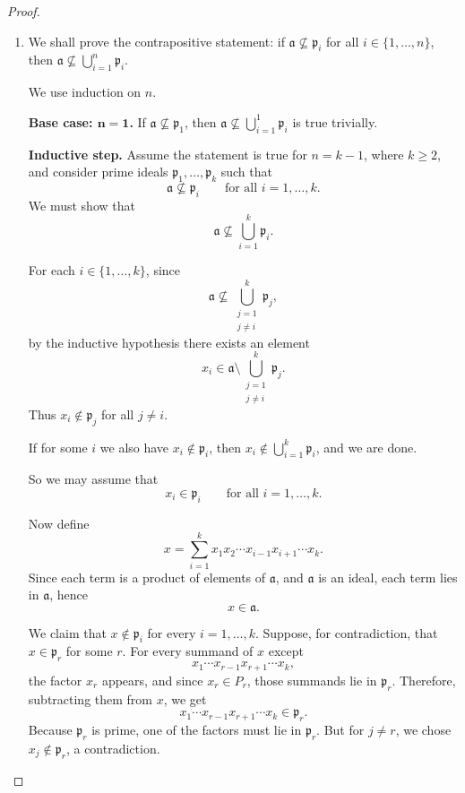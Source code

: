 \begin{proof}
    \begin{enumerate}[label=\roman*), leftmargin=*]
        \item We shall prove the contrapositive statement: if \(\mathfrak{a} \not\subseteq \mathfrak{p}_i\) for all \(i \in \{1, \ldots, n\}\), then \(\mathfrak{a} \not\subseteq \bigcup_{i=1}^n \mathfrak{p}_i\).

        We use induction on \(n\).

        \textbf{Base case: \(\mathbf{n=1}\).} If \(\mathfrak{a} \not\subseteq \mathfrak{p}_1\), then \(\mathfrak{a} \not\subseteq \bigcup_{i=1}^1 \mathfrak{p}_i\) is true trivially.

        \textbf{Inductive step.} Assume the statement is true for \(n=k-1\), where \(k\ge 2\), and consider prime ideals
\(\mathfrak{p}_1,\dots,\mathfrak{p}_k\) such that
\[
\mathfrak{a} \nsubseteq \mathfrak{p}_i \qquad \text{for all } i=1,\dots,k.
\]
We must show that
\[
\mathfrak{a} \nsubseteq \bigcup_{i=1}^k \mathfrak{p}_i.
\]

For each \(i\in\{1,\dots,k\}\), since
\[
\mathfrak{a} \nsubseteq \bigcup_{\substack{j=1\\ j\ne i}}^k \mathfrak{p}_j,
\]
by the inductive hypothesis there exists an element
\[
x_i \in \mathfrak{a} \setminus \bigcup_{\substack{j=1\\ j\ne i}}^k \mathfrak{p}_j.
\]
Thus \(x_i\notin \mathfrak{p}_j\) for all \(j\neq i\).

If for some \(i\) we also have \(x_i\notin \mathfrak{p}_i\), then \(x_i\notin \bigcup_{i=1}^k \mathfrak{p}_i\), and we are done.

So we may assume that
\[
x_i\in \mathfrak{p}_i \qquad \text{for all } i=1,\dots,k.
\]

Now define
\[
x=\sum_{i=1}^k x_1x_2\cdots x_{i-1}x_{i+1}\cdots x_k.
\]
Since each term is a product of elements of \(\mathfrak{a}\), and \(\mathfrak{a}\) is an ideal, each term lies in \(\mathfrak{a}\), hence
\[
x\in \mathfrak{a}.
\]

We claim that \(x\notin \mathfrak{p}_i\) for every \(i=1,\dots,k\). Suppose, for contradiction, that \(x\in \mathfrak{p}_r\) for some \(r\).
For every summand of \(x\) except
\[
x_1\cdots x_{r-1}x_{r+1}\cdots x_k,
\]
the factor \(x_r\) appears, and since \(x_r\in P_r\), those summands lie in \(\mathfrak{p}_r\). Therefore,
subtracting them from \(x\), we get
\[
x_1\cdots x_{r-1}x_{r+1}\cdots x_k \in \mathfrak{p}_r.
\]
Because \(\mathfrak{p}_r\) is prime, one of the factors must lie in \(\mathfrak{p}_r\). But for \(j\neq r\), we chose \(x_j\notin \mathfrak{p}_r\), a contradiction.


\end{enumerate}
\end{proof}
